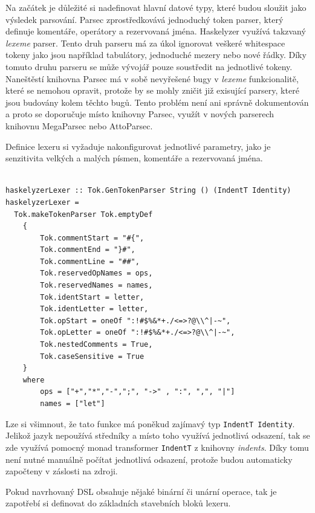 \documentclass[male,czech]{kithesis}
\newcommand{\haskellInline}[1]{\colorbox{gray!10}{\texttt{#1}}}
\begin{document}
Na začátek je důležité si nadefinovat hlavní datové typy, 
které budou sloužit jako výsledek parsování.
Parsec zprostředkovává jednoduchý token parser, 
který definuje komentáře, 
operátory a rezervovaná jména.
Haskelyzer využívá takzvaný \textit{lexeme} parser.
Tento druh parseru má za úkol ignorovat veškeré whitespace tokeny jako
jsou například tabulátory, 
jednoduché mezery nebo nové řádky.
Díky tomuto druhu parseru se může vývojář pouze soustředit na 
jednotlivé tokeny. 
Naneštěstí knihovna Parsec má v sobě nevyřešené bugy v \textit{lexeme} funkcionalitě, 
které se nemohou opravit, 
protože by se mohly zničit již exisující parsery,
které jsou budovány kolem těchto bugů.
Tento problém není ani správně dokumentován a 
proto se doporučuje místo knihovny Parsec, 
využít v nových parserech knihovnu MegaParsec nebo AttoParsec. 

Definice lexeru si vyžaduje nakonfigurovat jednotlivé parametry,
jako je senzitivita velkých a malých písmen, 
komentáře a rezervovaná jména.

\begin{verbatim}

haskelyzerLexer :: Tok.GenTokenParser String () (IndentT Identity)
haskelyzerLexer =
  Tok.makeTokenParser Tok.emptyDef 
    { 
        Tok.commentStart = "#{",
        Tok.commentEnd = "}#",
        Tok.commentLine = "##",
        Tok.reservedOpNames = ops,
        Tok.reservedNames = names,
        Tok.identStart = letter,
        Tok.identLetter = letter,
        Tok.opStart = oneOf ":!#$%&*+./<=>?@\\^|-~",
        Tok.opLetter = oneOf ":!#$%&*+./<=>?@\\^|-~",
        Tok.nestedComments = True,
        Tok.caseSensitive = True
    }
    where
        ops = ["+","*","-",";", "->" , ":", ",", "|"]
        names = ["let"]

\end{verbatim}

Lze si všimnout, 
že tato funkce má poněkud zajímavý typ \haskellInline{IndentT Identity}.
Jelikož jazyk nepoužívá středníky a 
místo toho využívá jednotlivá odsazení, 
tak se zde využívá pomocný monad transformer \haskellInline{IndentT} z knihovny \textit{indents}. 
Díky tomu není nutné manuálně počítat jednotlivá odsazení, 
protože budou automaticky započteny v záslosti na zdroji.

Pokud navrhovaný DSL obsahuje nějaké binární či unární operace, 
tak je zapotřebí si definovat do základních stavebních bloků lexeru.
\end{document}
